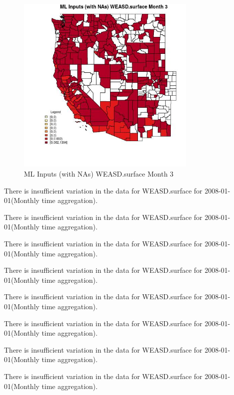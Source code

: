 \begin{figure} 
\centering  
\includegraphics[width=0.77\textwidth]{Code_Outputs/Report_ML_input_PM25_Step4_part_f_de_duplicated_aves_prioritize_24hr_obswNAs_CountyWEASDsurfacemedianMonth3.jpg} 
\caption{\label{fig:Report_ML_input_PM25_Step4_part_f_de_duplicated_aves_prioritize_24hr_obswNAsCountyWEASDsurfacemedianMonth3}ML Inputs (with NAs) WEASD.surface Month 3} 
\end{figure} 
 

There is insufficient variation in the data for WEASD.surface for 2008-01-01(Monthly time aggregation). 
 

There is insufficient variation in the data for WEASD.surface for 2008-01-01(Monthly time aggregation). 
 

There is insufficient variation in the data for WEASD.surface for 2008-01-01(Monthly time aggregation). 
 

There is insufficient variation in the data for WEASD.surface for 2008-01-01(Monthly time aggregation). 
 

There is insufficient variation in the data for WEASD.surface for 2008-01-01(Monthly time aggregation). 
 

There is insufficient variation in the data for WEASD.surface for 2008-01-01(Monthly time aggregation). 
 

There is insufficient variation in the data for WEASD.surface for 2008-01-01(Monthly time aggregation). 
 

There is insufficient variation in the data for WEASD.surface for 2008-01-01(Monthly time aggregation). 
 

